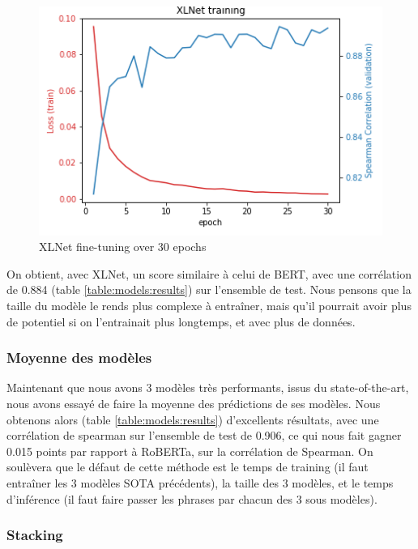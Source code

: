 \documentclass[11pt,a4paper, french]{article}
\begin{document}
\begin{figure}
  \includegraphics[width=\linewidth]{resources/xlnet-training.png}
  \caption{XLNet fine-tuning over 30 epochs}
  \label{fig:XLNet:finetunning}
\end{figure}

On obtient, avec XLNet, un score similaire à celui de BERT, avec une corrélation de 0.884 (table \ref{table:models:results}) sur l'ensemble de test. Nous pensons que la taille du modèle le rends plus complexe à entraîner, mais qu'il pourrait avoir plus de potentiel si on l'entrainait plus longtemps, et avec plus de données.

%
\subsubsection{Moyenne des modèles}

Maintenant que nous avons 3 modèles très performants, issus du state-of-the-art, nous avons essayé de faire la moyenne des prédictions de ses modèles. Nous obtenons alors (table \ref{table:models:results}) d'excellents résultats, avec une corrélation de spearman sur l'ensemble de test de 0.906, ce qui nous fait gagner 0.015 points par rapport à RoBERTa, sur la corrélation de Spearman. On soulèvera que le défaut de cette méthode est le temps de training (il faut entraîner les 3 modèles SOTA précédents), la taille des 3 modèles, et le temps d'inférence (il faut faire passer les phrases par chacun des 3 sous modèles).

%
\subsubsection{Stacking}
\end{document}
